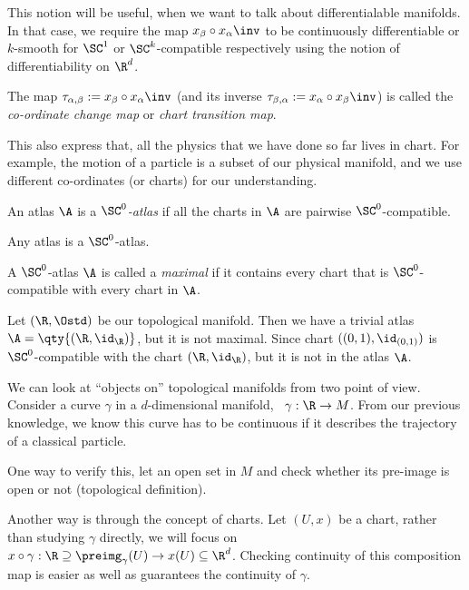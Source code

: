 This notion will be useful, when we want to talk about differentialable manifolds. In that case, we require the map \(x_{\beta} \circ x_{\alpha}\inv\) to be continuously differentiable or \(k\)-smooth for \(\SC^1\) or \(\SC^k\)-compatible respectively using the notion of differentiability on \(\R^d\).

\begin{remark}
	The map \(\tau_{\alpha, \beta} := x_{\beta} \circ x_{\alpha}\inv\) (and its inverse \(\tau_{\beta, \alpha} := x_{\alpha} \circ x_{\beta}\inv\)) is called the \emph{co-ordinate change map} or \emph{chart transition map}.
\end{remark}
This also express that, all the physics that we have done so far lives in chart. For example, the motion of a particle is a subset of our physical manifold, and we use different co-ordinates (or charts) for our understanding.

\begin{definition}[\(\SC^0\)-Atlas]\label{def:c0-atlas}
	An atlas \(\A\) is a \emph{\(\SC^0\)-atlas} if all the charts in \(\A\) are pairwise \(\SC^0\)-compatible.
\end{definition}

\noindent Any atlas is a \(\SC^0\)-atlas.

\begin{definition}
	A \(\SC^0\)-atlas \(\A\) is called a \emph{maximal} if it contains every chart that is \(\SC^0\)-compatible with every chart in \(\A\).
\end{definition}

\begin{example}
	Let \((\R, \Ostd)\) be our topological manifold. Then we have a trivial atlas \(\A = \qty{(\R, \id_{\R})}\), but it is not maximal. Since chart \(((0, 1), \id_{(0, 1)})\) is \(\SC^0\)-compatible with the chart \((\R, \id_{\R})\), but it is not in the atlas \(\A\).
\end{example}

We can look at ``objects on'' topological manifolds from two point of view. Consider a curve \(\gamma\) in a \(d\)-dimensional manifold, \ie\ \(\gamma: \R \to M\). From our previous knowledge, we know this curve has to be continuous if it describes the trajectory of a classical particle.

One way to verify this, let an open set in \(M\) and check whether its pre-image is open or not (topological definition).

Another way is through the concept of charts. Let \((U, x)\) be a chart, rather than studying \(\gamma\) directly, we will focus on \(x \circ \gamma: \R \supseteq \preimg_{\gamma}(U) \to x(U) \subseteq \R^d\). Checking continuity of this composition map is easier as well as guarantees the continuity of \(\gamma\).

